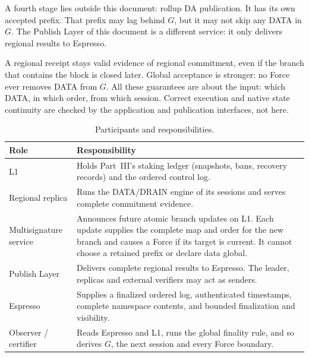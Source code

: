 \documentclass[11pt,a4paper]{article}
\begin{document}
A fourth stage lies outside this document: rollup DA publication. It
has its own accepted prefix. That prefix may lag behind $G$, but it may
not skip any DATA in $G$. The Publish Layer of this document is a
different service: it only delivers regional results to Espresso.

A regional receipt stays valid evidence of regional commitment, even if
the branch that contains the block is closed later. Global acceptance is
stronger: no Force ever removes DATA from $G$. All these guarantees are
about the input: which DATA, in which order, from which session. Correct
execution and native state continuity are checked by the application and
publication interfaces, not here.

\begin{table}[htbp]\centering\small
\caption{Participants and responsibilities.}\label{tab:roles}
\begin{tabularx}{\linewidth}{@{}>{\raggedright\arraybackslash}p{.19\linewidth}Y@{}}\toprule
Role & Responsibility\\\midrule
L1 & Holds Part~III's staking ledger (snapshots, bans, recovery records) and the ordered control log.\\
Regional replica & Runs the DATA/DRAIN engine of its sessions and
serves complete commitment evidence.\\
Multisignature service & Announces future atomic branch updates on L1.
Each update supplies the complete map and order for the new branch and causes a
Force if its target is current. It cannot choose a retained prefix or
declare data global.\\
Publish Layer & Delivers complete regional results to Espresso. The
leader, replicas and external verifiers may act as senders.\\
Espresso & Supplies a finalized ordered log, authenticated timestamps,
complete namespace contents, and bounded finalization and visibility.\\
Observer / certifier & Reads Espresso and L1, runs the global finality
rule, and so derives $G$, the next session and every Force boundary.\\
\bottomrule
\end{tabularx}
\end{table}
\end{document}
